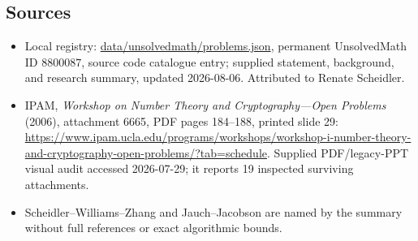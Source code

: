\documentclass[11pt]{article}
\begin{document}
\subsection{Sources}
\begin{itemize}
\item Local registry: \url{data/unsolvedmath/problems.json}, permanent UnsolvedMath ID \(8800087\), source code catalogue entry; supplied statement, background, and research summary, updated 2026-08-06. Attributed to Renate Scheidler.
\item IPAM, \emph{Workshop on Number Theory and Cryptography---Open Problems} (2006), attachment 6665, PDF pages 184--188, printed slide 29: \url{https://www.ipam.ucla.edu/programs/workshops/workshop-i-number-theory-and-cryptography-open-problems/?tab=schedule}. Supplied PDF/legacy-PPT visual audit accessed 2026-07-29; it reports 19 inspected surviving attachments.
\item Scheidler--Williams--Zhang and Jauch--Jacobson are named by the summary without full references or exact algorithmic bounds.
\end{itemize}
\end{document}
